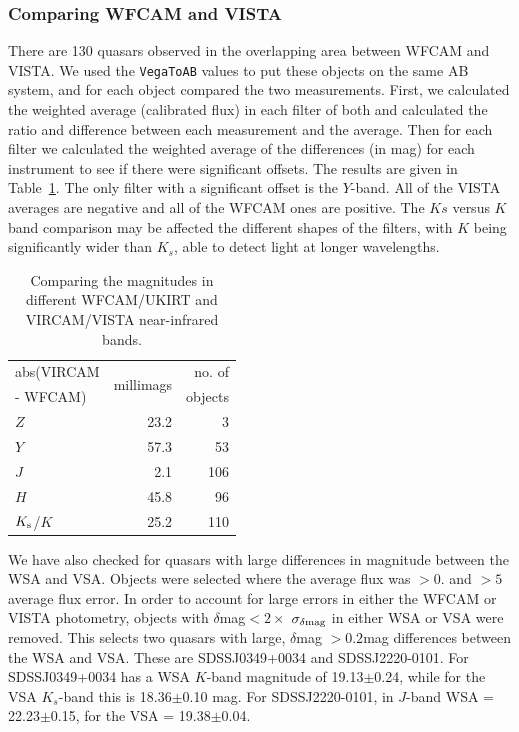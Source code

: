\documentclass[usenatbib]{mnras}
\begin{document}
  \subsubsection{Comparing WFCAM and VISTA}
  There are 130 quasars observed in the overlapping area between WFCAM
  and VISTA. We used the {\tt VegaToAB} values to put these objects on
  the same AB system, and for each object compared the two
  measurements. First, we calculated the weighted average (calibrated
  flux) in each filter of both and calculated the ratio and difference
  between each measurement and the average.  Then for each filter we
  calculated the weighted average of the differences (in mag) for each
  instrument to see if there were significant offsets. The results are
  given in Table~\ref{tab:WFCAM_vs_VISTA}.  The only filter with a
  significant offset is the $Y$-band. All of the VISTA averages are
  negative and all of the WFCAM ones are positive. The $Ks$ versus $K$
  band comparison may be affected the different shapes of the filters,
  with $K$ being significantly wider than $K_s$, able to detect light at
  longer wavelengths.
  \begin{table}
    \centering
    \begin{tabular}{l r r}
      \hline  \hline
      abs(VIRCAM & \multirow{2}{*}{millimags} &  no. of  \\
      -  WFCAM)      &                                        &  objects \\
      \hline
      $Z$                 &  23.2 	& 3 \\
      $Y$                 &  57.3 	& 53 \\
      $J$                  &    2.1 	& 106 \\
      $H$                 &  45.8     &  96 \\
      $K_{\rm s}$/$K$ &  25.2     & 110 \\
      \hline  \hline
    \end{tabular}
    \caption{Comparing the magnitudes in different WFCAM/UKIRT and 
      VIRCAM/VISTA near-infrared bands.}
    \label{tab:WFCAM_vs_VISTA}
  \end{table}
  
  We have also checked for quasars with large differences in magnitude
  between the WSA and VSA. Objects were selected where the average flux
  was $>0.$ and $>5$ average flux error. In order to account for large
  errors in either the WFCAM or VISTA photometry, objects with $\delta$mag$
  < 2 \times$ $\sigma_{\delta\rm mag}$ in either WSA or VSA were removed. This
  selects two quasars with large, $\delta$mag $>0.2$mag differences
  between the WSA and VSA. These are SDSSJ0349+0034 and
  SDSSJ2220-0101. For SDSSJ0349+0034 has a WSA $K$-band magnitude of
  19.13$\pm$0.24, while for the VSA $K_s$-band this is 18.36$\pm$0.10
  mag. For SDSSJ2220-0101, in $J$-band WSA = 22.23$\pm$0.15, for the VSA
  = 19.38$\pm$0.04.
          
\end{document}

